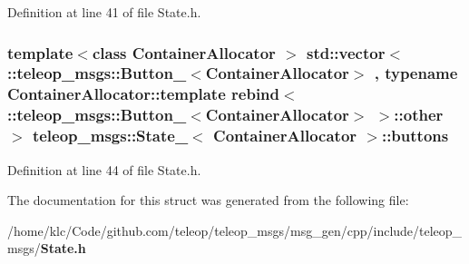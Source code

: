 Definition at line 41 of file State.h.

\subsubsection[{buttons}]{\setlength{\rightskip}{0pt plus 5cm}template$<$class ContainerAllocator $>$ std::vector$<$ ::{\bf teleop\_\-msgs::Button\_\-}$<$ContainerAllocator$>$ , typename ContainerAllocator::template rebind$<$ ::{\bf teleop\_\-msgs::Button\_\-}$<$ContainerAllocator$>$ $>$::other $>$ {\bf teleop\_\-msgs::State\_\-}$<$ ContainerAllocator $>$::{\bf buttons}}\label{structteleop__msgs_1_1State___ae70aec395eff33e08c0275256b0acf46}


Definition at line 44 of file State.h.



The documentation for this struct was generated from the following file:\begin{DoxyCompactItemize}
\item 
/home/klc/Code/github.com/teleop/teleop\_\-msgs/msg\_\-gen/cpp/include/teleop\_\-msgs/{\bf State.h}\end{DoxyCompactItemize}
